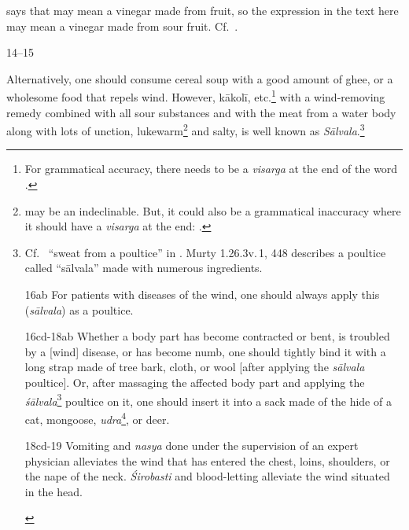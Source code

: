 \begin{translation}
{    \cite[70]{moni-sans} says that  may mean a vinegar made 
    from fruit, so the expression  in the text here may 
    mean a vinegar made from sour fruit. Cf.\ .}
    
    
    \item[14--15]
    
  
    
    Alternatively, one should consume cereal soup with a good amount
of ghee, or a wholesome food that repels wind. However,
\gls{kākolī}, etc.\footnote{For grammatical accuracy, there needs
    to be a \emph{visarga} at the end of the word .}
    with a wind-removing remedy combined with all sour substances and
    with the meat from a water body along with lots of unction,
    lukewarm\footnote{ may be an indeclinable. But,
        it could also be a grammatical inaccuracy where it should have a
        \textit{visarga} at the end: .} and salty, is well
        known as \textit{Sālvala}.\footnote{Cf.\  “sweat from
            a poultice” in \cite[898]{josi-maha}.              
            Murty {1.26.3}{v.\,1, 448} describes a poultice called “sālvala” made 
            with numerous ingredients.

    \item[16ab]
    For patients with diseases of the wind, one should always apply this 
    (\textit{sālvala}) as a poultice.
    
    
    \bigskip       
    \begin{tt}
    \item[16cd-18ab]
     Whether a body part has become contracted or bent, is troubled by a 
     [wind] disease, or has become numb, one should tightly bind it with a long 
     strap made of tree bark, cloth, or wool [after applying the \textit{sālvala} 
     poultice]. Or, after massaging the affected body part and applying the 
     \textit{śālvala}\footnote{This seems to be the correct spelling as against 
     the unclarity in the earlier verses.} poultice on it, one should insert it into a 
     sack made of the hide of a cat, mongoose, \textit{udra}\footnote{some 
     aquatic animal}, or deer.

    \item[18cd-19]
    Vomiting and \textit{nasya} done under the supervision of an expert 
    physician alleviates the wind that has entered the chest, loins, shoulders, or 
    the nape of the neck. \textit{Śirobasti} and blood-letting alleviate the wind 
    situated in the head. 


\end{tt}}
\end{translation}
